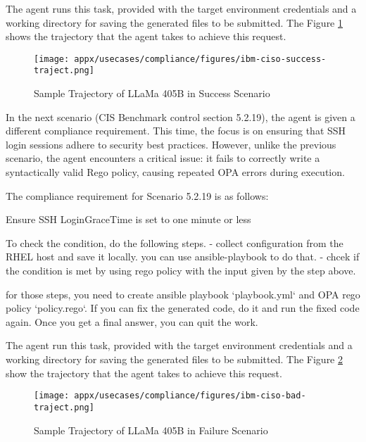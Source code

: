 The agent runs this task, provided with the target environment credentials and a working directory for saving the generated files to be submitted.
The Figure \ref{fig:rhelsuccess-1} shows the trajectory that the agent takes to achieve this request.  

\def\rhelsuccess{Success Scenario}
\def\rhelfailure{Failure Scenario}

\begin{figure}[hbtp]
    \centering
    \texttt{[image: appx/usecases/compliance/figures/ibm-ciso-success-traject.png]}
    \caption{Sample Trajectory of LLaMa 405B in \rhelsuccess} 
    \label{fig:rhelsuccess-1}
\end{figure} 

\vspace{1em}

In the next scenario (CIS Benchmark control section 5.2.19), the agent is given a different compliance requirement.  
This time, the focus is on ensuring that SSH login sessions adhere to security best practices.
However, unlike the previous scenario, the agent encounters a critical issue: it fails to correctly write a syntactically valid Rego policy, causing repeated OPA errors during execution.  

The compliance requirement for Scenario 5.2.19 is as follows:

\begin{mdframed}
Ensure SSH LoginGraceTime is set to one minute or less 

To check the condition, do the following steps. 
- collect configuration from the RHEL host and save it locally. you can use ansible-playbook to do that. 
- chcek if the condition is met by using rego policy with the input given by the step above. 

for those steps, you need to create ansible playbook `playbook.yml` and OPA rego policy `policy.rego`.
If you can fix the generated code, do it and run the fixed code again.
Once you get a final answer, you can quit the work.

\end{mdframed}

The agent run this task, provided with the target environment credentials and a working directory for saving the generated files to be submitted.
The Figure \ref{fig:rhelfailure-1} show the trajectory that the agent takes to achieve this request.  

\begin{figure}[hbtp]
    \centering
    \texttt{[image: appx/usecases/compliance/figures/ibm-ciso-bad-traject.png]}
    \caption{Sample Trajectory of LLaMa 405B in \rhelfailure} 
    \label{fig:rhelfailure-1}
\end{figure} 


